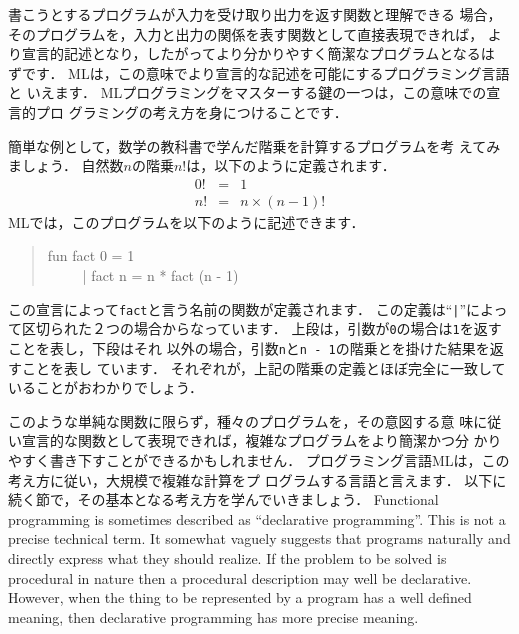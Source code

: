 \documentclass{jbook}
\begin{document}
	書こうとするプログラムが入力を受け取り出力を返す関数と理解できる
場合，そのプログラムを，入力と出力の関係を表す関数として直接表現できれば，
より宣言的記述となり，したがってより分かりやすく簡潔なプログラムとなるは
ずです．
	MLは，この意味でより宣言的な記述を可能にするプログラミング言語と
いえます．
	MLプログラミングをマスターする鍵の一つは，この意味での宣言的プロ
グラミングの考え方を身につけることです．

簡単な例として，数学の教科書で学んだ階乗を計算するプログラムを考
えてみましょう．
自然数$n$の階乗$n !$は，以下のように定義されます．
\begin{eqnarray*}
0 ! &=& 1
\\
n ! &=& n \times (n - 1) !
\end{eqnarray*}
MLでは，このプログラムを以下のように記述できます．
\begin{tt}
\begin{quote}
fun fact 0 = 1\\
\ \ \ \ \ | fact n = n * fact (n - 1)
\end{quote}
\end{tt}
	この宣言によって{\tt fact}と言う名前の関数が定義されます．
	この定義は``{\tt |}''によって区切られた２つの場合からなっています．
	上段は，引数が{\tt 0}の場合は{\tt 1}を返すことを表し，下段はそれ
以外の場合，引数{\tt n}と{\tt n - 1}の階乗とを掛けた結果を返すことを表し
ています．
	それぞれが，上記の階乗の定義とほぼ完全に一致していることがおわかりでしょう．
	
	このような単純な関数に限らず，種々のプログラムを，その意図する意
味に従い宣言的な関数として表現できれば，複雑なプログラムをより簡潔かつ分
かりやすく書き下すことができるかもしれません．
	プログラミング言語MLは，この考え方に従い，大規模で複雑な計算をプ
ログラムする言語と言えます．
	以下に続く節で，その基本となる考え方を学んでいきましょう．
\else%
	Functional programming is sometimes described as ``declarative
programming''.
	This is not a precise technical term.
	It somewhat vaguely suggests that programs naturally and
directly express what they should realize.
	If the problem to be solved is procedural in nature then a
procedural description may well be declarative.
	However, when the thing to be represented by a program has a
well defined meaning, then declarative programming has more precise
meaning.
	
\end{document}
